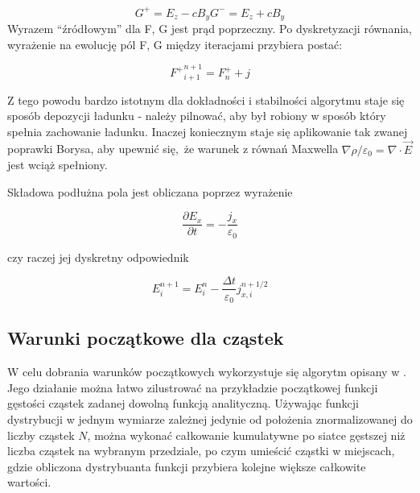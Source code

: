     \begin{equation}
        G^{+} = E_z - c B_y
        G^{-} = E_z + c B_y
        \label{eqn:Birdsall-electromagnetic-quantities-alternate-axes}
    \end{equation}
    Wyrazem ``źródłowym'' dla F, G jest prąd poprzeczny. Po dyskretyzacji równania, wyrażenie na ewolucję pól F, G między
    iteracjami przybiera postać:

    \begin{equation}
        {F^{+}}^{n+1}_{i+1} = F^{+}_{n} + j%
    \end{equation}

    Z tego powodu bardzo istotnym dla dokładności i stabilności algorytmu staje się sposób depozycji ładunku - należy pilnować,
    aby był robiony w sposób który spełnia zachowanie ładunku. Inaczej koniecznym staje się aplikowanie tak zwanej
    poprawki Borysa, %
    aby upewnić się, że warunek z równań Maxwella $\nabla \rho / \varepsilon_0 = \nabla \cdot \vec{E}$ jest
    wciąż spełniony.

    Składowa podłużna pola jest obliczana poprzez wyrażenie

    \begin{equation}
    \frac{\partial E_x}{\partial t} = - \frac{j_x}{\varepsilon_0}
    \label{longitudinal-field-differential}
    \end{equation}

    czy raczej jej dyskretny odpowiednik

    \begin{equation}
        E_i^{n+1} = E_i^n - \frac{\Delta t}{\varepsilon_0} j_{x,i}^{n+1/2}
    \label{longitudinal-field-finite-differential}
    \end{equation}


    \subsection{Warunki początkowe dla cząstek}

    W celu dobrania warunków początkowych wykorzystuje się algorytm opisany w .%
    Jego działanie można łatwo zilustrować na przykładzie początkowej funkcji gęstości cząstek zadanej
    dowolną funkcją analityczną. %
    Używając funkcji dystrybucji w jednym wymiarze zależnej jedynie od położenia znormalizowanej do
    liczby cząstek $N$, można wykonać całkowanie kumulatywne po siatce gęstszej niż liczba cząstek
    na wybranym przedziale, po czym umieścić cząstki w miejscach, gdzie obliczona dystrybuanta funkcji
    przybiera kolejne większe całkowite wartości.

